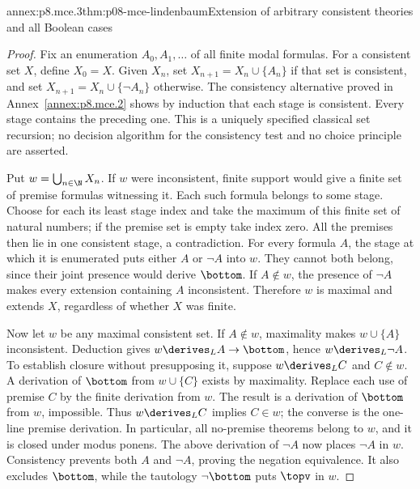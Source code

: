 \begin{annexitem}{annex:p8.mce.3}{thm:p08-mce-lindenbaum}{Extension of arbitrary consistent theories and all Boolean cases}
\begin{proof}
Fix an enumeration \(A_0,A_1,\ldots\) of all finite modal formulas.
For a consistent set \(X\), define \(X_0=X\). Given \(X_n\), set
\(X_{n+1}=X_n\cup\{A_n\}\) if that set is consistent, and set
\(X_{n+1}=X_n\cup\{\neg A_n\}\) otherwise. The consistency
alternative proved in Annex~\ref{annex:p8.mce.2} shows by induction that
each stage is consistent. Every stage contains the preceding one.
This is a uniquely specified classical set recursion; no decision algorithm
for the consistency test and no choice principle are asserted.

Put \(w=\bigcup_{n\in\N}X_n\). If \(w\) were inconsistent,
finite support would give a finite set of premise formulas witnessing it.
Each such formula belongs to some stage. Choose for each its least stage
index and take the maximum of this finite set of natural numbers; if the
premise set is empty take index zero. All the premises then lie in one
consistent stage, a contradiction. For every formula \(A\), the stage
at which it is enumerated puts either \(A\) or \(\neg A\) into
\(w\). They cannot both belong, since their joint presence would derive
\(\bottom\). If \(A\notin w\), the presence of \(\neg A\)
makes every extension containing \(A\) inconsistent. Therefore \(w\)
is maximal and extends \(X\), regardless of whether \(X\) was finite.

Now let \(w\) be any maximal consistent set. If \(A\notin w\),
maximality makes \(w\cup\{A\}\) inconsistent. Deduction gives
\(w\derives_L A\to\bottom\), hence
\(w\derives_L\neg A\). To establish closure without presupposing it,
suppose \(w\derives_L C\) and \(C\notin w\). A derivation of
\(\bottom\) from \(w\cup\{C\}\) exists by maximality.
Replace each use of premise \(C\) by the finite derivation from \(w\).
The result is a derivation of \(\bottom\) from \(w\), impossible.
Thus \(w\derives_L C\) implies \(C\in w\); the converse is the
one-line premise derivation. In particular, all no-premise theorems belong
to \(w\), and it is closed under modus ponens. The above derivation of
\(\neg A\) now places \(\neg A\) in \(w\). Consistency prevents
both \(A\) and \(\neg A\), proving the negation equivalence.
It also excludes \(\bottom\), while the tautology \(\neg\bottom\)
puts \(\topv\) in \(w\).


\end{proof}
\end{annexitem}
